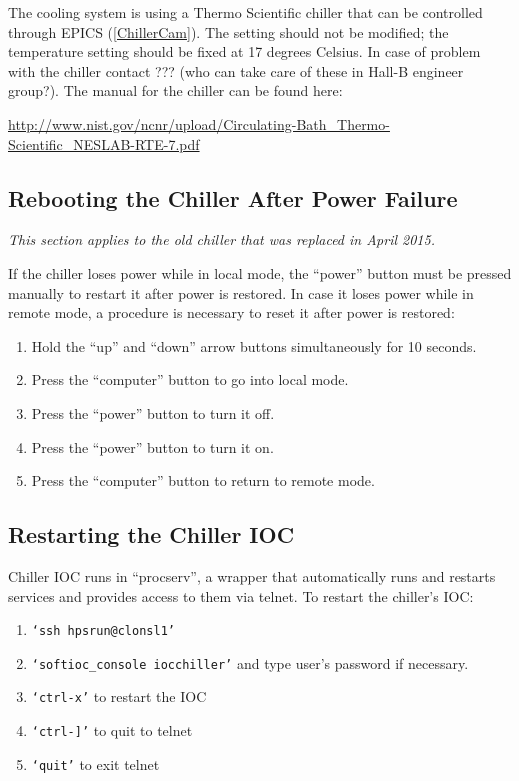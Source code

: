 \documentclass[12pt]{article}
\begin{document}
{   The cooling system is using a Thermo Scientific chiller that can be controlled through EPICS (\ref{ChillerCam}). The setting should not be modified; the temperature setting should be fixed at 17 degrees Celsius. In case of problem with the chiller contact ??? (who can take care of these in Hall-B engineer group?).  The manual for the chiller can be found here:

   {\noindent\footnotesize\url{http://www.nist.gov/ncnr/upload/Circulating-Bath\_Thermo-Scientific\_NESLAB-RTE-7.pdf}}
     \subsection{Rebooting the Chiller After Power Failure}
     {\em This section applies to the old chiller that was replaced in April 2015.}

     If the chiller loses power while in local mode, the ``power'' button must be pressed manually to restart it after power is restored.  In case it loses power while in remote mode, a procedure is necessary to reset it after power is restored:
   {\footnotesize
     \begin{enumerate}
         \item Hold the ``up'' and ``down'' arrow buttons simultaneously for 10 seconds.
         \item Press the ``computer'' button to go into local mode.
         \item Press the ``power'' button to turn it off.
         \item Press the ``power'' button to turn it on.
         \item Press the ``computer'' button to return to remote mode.
    \end{enumerate}
    }

    \subsection{Restarting the Chiller IOC}
    Chiller IOC runs in ``procserv'', a wrapper that automatically runs and restarts services and provides access to them via telnet.  To restart the chiller's IOC:
   {\footnotesize
   \begin{enumerate}
       \item \texttt{`ssh hpsrun@clonsl1'}
       \item \texttt{`softioc\_console iocchiller'} and type user's password if necessary.
       \item \texttt{`ctrl-x'} to restart the IOC
       \item \texttt{`ctrl-]'} to quit to telnet
       \item \texttt{`quit'} to exit telnet
   \end{enumerate}
   }

}
\end{document}
